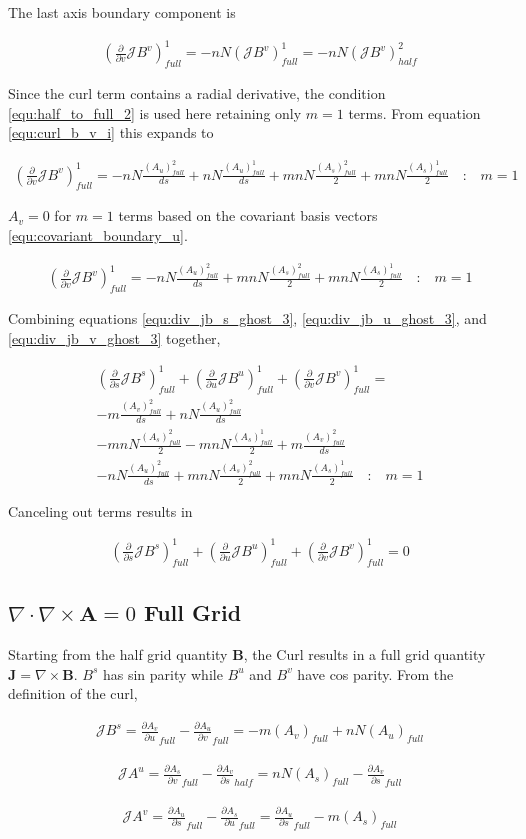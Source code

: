 \documentclass[11pt]{article}
\newcommand{\brackets}[1]{\left(#1\right)}
\renewcommand{\vec}[1]{\boldsymbol#1}
\newcommand{\equ}[2]{
	\begin{equation}
    \begin{split}
	#1
	\label{#2}
	\end{split}
	\end{equation}
}
\newcommand{\dotp}[2]{#1\cdot#2}
\newcommand{\crossp}[2]{#1\times#2}
\newcommand{\curl}[1]{\crossp{\nabla}{#1}}
\newcommand{\divergence}[1]{\dotp{\nabla}{#1}}
\begin{document}
The last axis boundary component is
\equ{
\brackets{\frac{\partial}{\partial v}\mathcal{J}B^{v}}^{1}_{full}=-nN\brackets{\mathcal{J}B^{v}}^{1}_{full}=-nN\brackets{\mathcal{J}B^{v}}^{2}_{half}
}{equ:div_jb_v_ghost}
Since the curl term contains a radial derivative, the condition \ref{equ:half_to_full_2} is used here retaining only $m=1$ terms.
From equation \ref{equ:curl_b_v_i} this expands to
\equ{
\brackets{\frac{\partial}{\partial v}\mathcal{J}B^{v}}^{1}_{full}=-nN\frac{\brackets{A_{u}}^{2}_{full}}{ds}+nN\frac{\brackets{A_{u}}^{1}_{full}}{ds}+mnN\frac{\brackets{A_{s}}^{2}_{full}}{2}+mnN\frac{\brackets{A_{s}}^{1}_{full}}{2}\quad\textrm{:}\quad m=1
}{equ:div_jb_v_ghost_2}
$A_{v}=0$ for $m=1$ terms based on the covariant basis vectors \ref{equ:covariant_boundary_u}.
\equ{
\brackets{\frac{\partial}{\partial v}\mathcal{J}B^{v}}^{1}_{full}=-nN\frac{\brackets{A_{u}}^{2}_{full}}{ds}+mnN\frac{\brackets{A_{s}}^{2}_{full}}{2}+mnN\frac{\brackets{A_{s}}^{1}_{full}}{2}\quad\textrm{:}\quad m=1
}{equ:div_jb_v_ghost_3}

Combining equations \ref{equ:div_jb_s_ghost_3}, \ref{equ:div_jb_u_ghost_3}, and \ref{equ:div_jb_v_ghost_3} together,
\equ{
\brackets{\frac{\partial}{\partial s}\mathcal{J}B^{s}}^{1}_{full}+\brackets{\frac{\partial}{\partial u}\mathcal{J}B^{u}}^{1}_{full}+\brackets{\frac{\partial}{\partial v}\mathcal{J}B^{v}}^{1}_{full}=\\
-m\frac{\brackets{A_{v}}^{2}_{full}}{ds}+nN\frac{\brackets{A_{u}}^{2}_{full}}{ds}\\
-mnN\frac{\brackets{A_{s}}^{2}_{full}}{2}-mnN\frac{\brackets{A_{s}}^{1}_{full}}{2}+m\frac{\brackets{A_{v}}^{2}_{full}}{ds}\\
-nN\frac{\brackets{A_{u}}^{2}_{full}}{ds}+mnN\frac{\brackets{A_{s}}^{2}_{full}}{2}+mnN\frac{\brackets{A_{s}}^{1}_{full}}{2}\quad\textrm{:}\quad m=1
}{equ:div_total_1_1}
Canceling out terms results in 
\equ{
\brackets{\frac{\partial}{\partial s}\mathcal{J}B^{s}}^{1}_{full}+\brackets{\frac{\partial}{\partial u}\mathcal{J}B^{u}}^{1}_{full}+\brackets{\frac{\partial}{\partial v}\mathcal{J}B^{v}}^{1}_{full}=0
}{equ:div_total_1_2}

\subsection{$\divergence{\curl{\vec{A}}} = 0$ Full Grid}
Starting from the half grid quantity $\vec{B}$, the Curl results in a full grid quantity $\vec{J}=\curl{\vec{B}}$.
$B^{s}$ has sin parity while $B^{u}$ and $B^{v}$ have cos parity. From the definition of the curl,
\equ{
\mathcal{J}B^{s}=\frac{\partial A_{v}}{\partial u}_{full} - \frac{\partial A_{u}}{\partial v}_{full}=-m\brackets{A_{v}}_{full}+nN\brackets{A_{u}}_{full}
}{equ:curl_j_s}
\equ{
\mathcal{J}A^{u}=\frac{\partial A_{s}}{\partial v}_{full}-\frac{\partial A_{v}}{\partial s}_{half}=nN\brackets{A_{s}}_{full}-\frac{\partial A_{v}}{\partial s}_{full}
}{equ:curl_j_u}
\equ{
\mathcal{J}A^{v}=\frac{\partial A_{u}}{\partial s}_{full}-\frac{\partial A_{s}}{\partial u}_{full}=\frac{\partial A_{u}}{\partial s}_{full}-m\brackets{A_{s}}_{full}
}{equ:curl_j_v}
\end{document}
